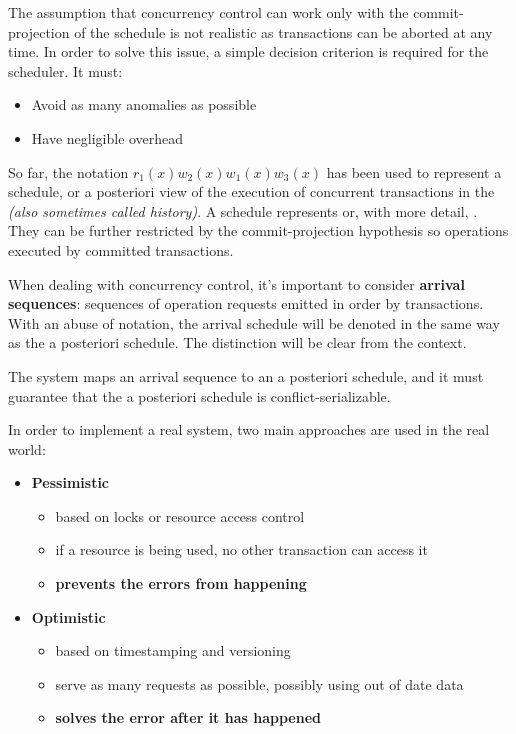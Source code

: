 \documentclass[english]{article}
\begin{document}
The assumption that concurrency control can work only with the commit-projection of the schedule is not realistic as transactions can be aborted at any time.
In order to solve this issue, a simple decision criterion is required for the scheduler.
It must:

\begin{itemize}
  \item Avoid as many anomalies as possible
  \item Have negligible overhead
\end{itemize}

So far, the notation \(r_1(x) w_2(x) w_1(x) w_3(x)\) has been used to represent a schedule, or a posteriori view of the execution of concurrent transactions in the \DBMS \textit{(also sometimes called history)}.
A schedule represents  or, with more detail, .
They can be further restricted by the commit-projection hypothesis so operations executed by committed transactions.

When dealing with concurrency control, it's important to consider \textbf{arrival sequences}: sequences of operation requests emitted in order by transactions.
With an abuse of notation, the arrival schedule will be denoted in the same way as the a posteriori schedule.
The distinction will be clear from the context.

The \CC system maps an arrival sequence to an a posteriori schedule, and it must guarantee that the a posteriori schedule is conflict-serializable.

\bigskip

In order to implement a real \CC system, two main approaches are used in the real world:

\begin{itemize}
  \item \textbf{Pessimistic}
        \begin{itemize}
          \item based on locks or resource access control
          \item if a resource is being used, no other transaction can access it
          \item \textbf{prevents the errors from happening}
        \end{itemize}
  \item \textbf{Optimistic}
        \begin{itemize}
          \item based on timestamping and versioning
          \item serve as many requests as possible, possibly using out of date data
          \item \textbf{solves the error after it has happened}
        \end{itemize}
\end{itemize}
\end{document}
